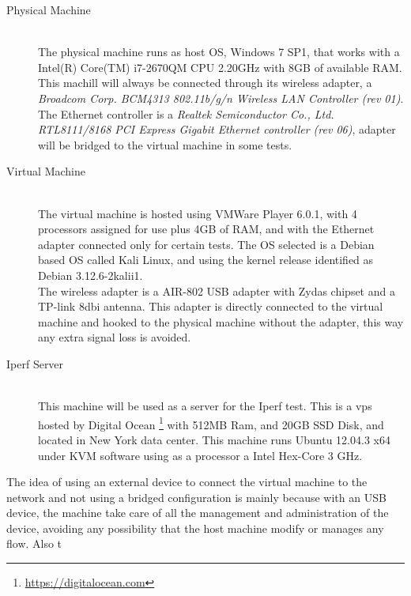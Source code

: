 \begin{description}

\item [Physical Machine] \hfill \\
The physical machine runs as host OS, Windows 7 SP1, that works with a Intel(R)
Core(TM) i7-2670QM CPU \@ 2.20GHz with 8GB of available RAM. This machill will 
always be connected through its wireless adapter, a \textit{Broadcom Corp. 
BCM4313 802.11b/g/n Wireless LAN Controller (rev 01)}. The Ethernet controller 
is a \textit{Realtek Semiconductor Co., Ltd. RTL8111/8168 PCI Express Gigabit 
Ethernet controller (rev 06)}, adapter will be bridged to the virtual 
machine in some tests.\\

\item[Virtual Machine] \hfill \\
The virtual machine is hosted using VMWare Player 6.0.1, with 4 processors 
assigned for use plus 4GB of RAM, and with the Ethernet adapter connected only
for certain tests. The OS selected is a Debian based OS called Kali Linux, and
using the kernel release identified as Debian 3.12.6-2kalii1.\\

The wireless adapter is a AIR-802 USB adapter with Zydas chipset and a TP-link 
8dbi antenna. This adapter is directly connected to the virtual machine and 
hooked to the physical machine without the adapter, this way any extra signal 
loss is avoided. \\

\item[Iperf Server] \hfill \\
This machine will be used as a server for the Iperf test. This is a vps hosted 
by Digital Ocean \footnote{\url{https://digitalocean.com}} with 512MB Ram, and 
20GB SSD Disk, and located in New York data center. This machine runs Ubuntu 
12.04.3 x64 under KVM software using as a processor a Intel Hex-Core 3 GHz.

\end{description}

The idea of using an external device to connect the virtual machine to the 
network and not using a bridged configuration is mainly because with an USB 
device, the machine take care of all the management and administration of the 
device, avoiding any possibility that the host machine modify or manages any 
flow. Also t
